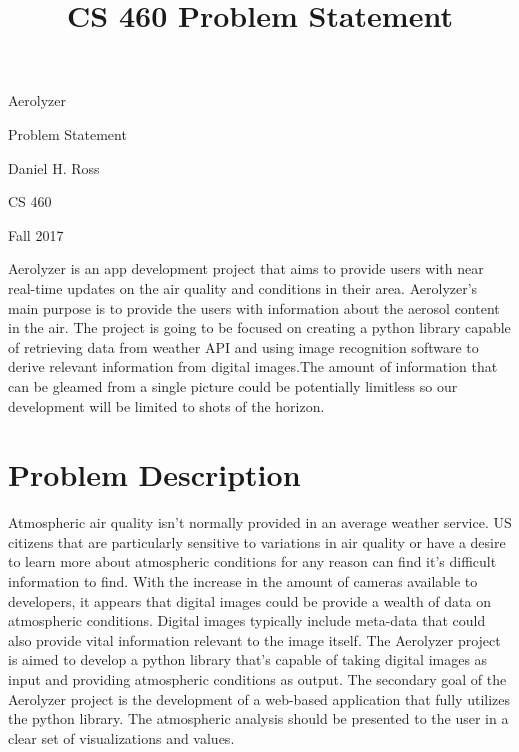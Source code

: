 \documentclass[letterpaper, 10pt, titlepage, fleqn, onecolumn]{article}
\title{CS 460 Problem Statement}
\author{\name}
\makeatletter
\renewenvironment{abstract}{%
      \@beginparpenalty\@lowpenalty
      \begin{center}%
        \bfseries \abstractname
        \@endparpenalty\@M
      \end{center}}%
     {\par%
     }
\def\name{Daniel H. Ross}
\makeatother
\begin{document}
\begin{titlepage}
	{\centering
    \vspace*{2.5in}
    {\LARGE Aerolyzer \par}
    {\Large Problem Statement \par}
    \vspace{0.2in}
    {\Large \name \par}
    {\large CS 460 \par}
    {\large Fall 2017 \par}
    }
    \vspace{0.2in}
	\begin{abstract}
	Aerolyzer is an app development project that aims to provide users with near real-time updates on the air quality and conditions in their area. Aerolyzer's main purpose is to provide the users with information about the aerosol content in the air. The project is going to be focused on creating a python library capable of retrieving data from weather API and using image recognition software to derive relevant information from digital images.The amount of information that can be gleamed from a single picture could be potentially limitless so our development will be limited to shots of the horizon.
	\end{abstract}
\end{titlepage}



\vspace{0.1in}

\section*{Problem Description}
Atmospheric air quality isn't normally provided in an average weather service. US citizens that are particularly sensitive to variations in air quality or have a desire to learn more about atmospheric conditions for any reason can find it's difficult information to find. With the increase in the amount of cameras available to developers, it appears that digital images could be provide a wealth of data on atmospheric conditions. Digital images typically include meta-data that could also provide vital information relevant to the image itself. The Aerolyzer project is aimed to develop a python library that's capable of taking digital images as input and providing atmospheric conditions as output. The secondary goal of the Aerolyzer project is the development of a web-based application that fully utilizes the python library. The atmospheric analysis should be presented to the user in a clear set of visualizations and values. \par
\end{document}
